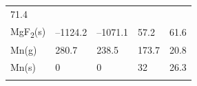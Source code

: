 \documentclass[
  9pt,
]{extbook}
\theoremstyle{definition}
\theoremstyle{definition}
\theoremstyle{definition}
\theoremstyle{remark}
\begin{document}
\begin{longtable}[]{@{}lllll@{}}
\begin{minipage}[t]{0.18\columnwidth}
71.4\strut
\end{minipage}\tabularnewline
\begin{minipage}[t]{0.10\columnwidth}\raggedright
MgF\textsubscript{2}(s)\strut
\end{minipage} & \begin{minipage}[t]{0.19\columnwidth}\raggedright
--1124.2\strut
\end{minipage} & \begin{minipage}[t]{0.20\columnwidth}\raggedright
--1071.1\strut
\end{minipage} & \begin{minipage}[t]{0.18\columnwidth}\raggedright
57.2\strut
\end{minipage} & \begin{minipage}[t]{0.18\columnwidth}\raggedright
61.6\strut
\end{minipage}\tabularnewline
\begin{minipage}[t]{0.10\columnwidth}\raggedright
Mn(g)\strut
\end{minipage} & \begin{minipage}[t]{0.19\columnwidth}\raggedright
280.7\strut
\end{minipage} & \begin{minipage}[t]{0.20\columnwidth}\raggedright
238.5\strut
\end{minipage} & \begin{minipage}[t]{0.18\columnwidth}\raggedright
173.7\strut
\end{minipage} & \begin{minipage}[t]{0.18\columnwidth}\raggedright
20.8\strut
\end{minipage}\tabularnewline
\begin{minipage}[t]{0.10\columnwidth}\raggedright
Mn(s)\strut
\end{minipage} & \begin{minipage}[t]{0.19\columnwidth}\raggedright
0\strut
\end{minipage} & \begin{minipage}[t]{0.20\columnwidth}\raggedright
0\strut
\end{minipage} & \begin{minipage}[t]{0.18\columnwidth}\raggedright
32\strut
\end{minipage} & \begin{minipage}[t]{0.18\columnwidth}\raggedright
26.3\strut
\end{minipage}\tabularnewline
\begin{minipage}[t]{0.10\columnwidth}\raggedright

\end{minipage}
\end{longtable}
\end{document}
